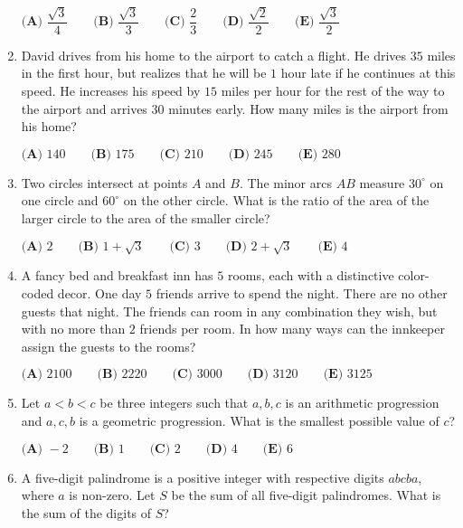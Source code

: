 \documentclass{article}
\begin{document}
\begin{enumerate}[label=\arabic*., itemsep=0.5em]
\(\textbf{(A) }\dfrac{\sqrt3}4\qquad
\textbf{(B) }\dfrac{\sqrt3}3\qquad
\textbf{(C) }\dfrac23\qquad
\textbf{(D) }\dfrac{\sqrt2}2\qquad
\textbf{(E) }\dfrac{\sqrt3}2\)\par \vspace{0.5em}\item David drives from his home to the airport to catch a flight.  He drives \(35\) miles in the first hour, but realizes that he will be \(1\) hour late if he continues at this speed.  He increases his speed by \(15\) miles per hour for the rest of the way to the airport and arrives \(30\) minutes early.  How many miles is the airport from his home?

\(\textbf{(A) }140\qquad
\textbf{(B) }175\qquad
\textbf{(C) }210\qquad
\textbf{(D) }245\qquad
\textbf{(E) }280\qquad\)\par \vspace{0.5em}\item Two circles intersect at points \(A\) and \(B\).  The minor arcs \(AB\) measure \(30^\circ\) on one circle and \(60^\circ\) on the other circle.  What is the ratio of the area of the larger circle to the area of the smaller circle?

\(\textbf{(A) }2\qquad
\textbf{(B) }1+\sqrt3\qquad
\textbf{(C) }3\qquad
\textbf{(D) }2+\sqrt3\qquad
\textbf{(E) }4\qquad\)\par \vspace{0.5em}\item A fancy bed and breakfast inn has \(5\) rooms, each with a distinctive color-coded decor.  One day \(5\) friends arrive to spend the night.  There are no other guests that night.  The friends can room in any combination they wish, but with no more than \(2\) friends per room.  In how many ways can the innkeeper assign the guests to the rooms?

\(\textbf{(A) }2100\qquad
\textbf{(B) }2220\qquad
\textbf{(C) }3000\qquad
\textbf{(D) }3120\qquad
\textbf{(E) }3125\qquad\)\par \vspace{0.5em}\item Let \(a<b<c\) be three integers such that \(a,b,c\) is an arithmetic progression and \(a,c,b\) is a geometric progression.  What is the smallest possible value of \(c\)?

\(\textbf{(A) }-2\qquad
\textbf{(B) }1\qquad
\textbf{(C) }2\qquad
\textbf{(D) }4\qquad
\textbf{(E) }6\qquad\)\par \vspace{0.5em}\item A five-digit palindrome is a positive integer with respective digits \(abcba\), where \(a\) is non-zero.  Let \(S\) be the sum of all five-digit palindromes.  What is the sum of the digits of \(S\)?


\end{enumerate}
\end{document}

